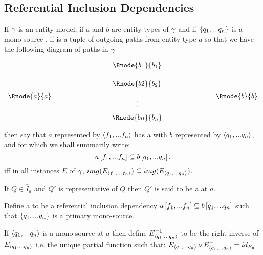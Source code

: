 \subsection{Referential Inclusion Dependencies}


\begin{definition}
If $\gamma$ is an entity model, 
if $a$ and $b$ are entity types of  $\gamma$ and  if $\left\{q_1,...q_n\right\}$
is a mono-source ,
if \fntuple is a tuple of outgoing paths from entity type $a$  
so that we have the following diagram of paths in $\gamma$
\setlength{\arraycolsep}{.2cm}
\begin{center}
$
\begin{array}{cp{2cm}ccp{2cm}c}
             & &         & \Rnode{b1}{b_1} &&               \\ [0.5cm]
						 & &         & \Rnode{b2}{b_2} &&               \\ [0.2cm]
\Rnode{a}{a} & &         &                 &&  \Rnode{b}{b} \\ [-0.2cm]						
             & &         &    \vdots       &&               \\ [0.2cm]
             & &         & \Rnode{bn}{b_n} &&               \\ 
\end{array}
$
\end{center}
then say that $a$ represented by $\langle f_1,...f_n\rangle$ 
has a  with $b$ represented by $\langle q_1,...q_n\rangle$, and for which we shall summarily write:
$$
a\left[f_1,...f_n\right]\subseteq b\left[q_1,...q_n\right],
$$
iff in all instances $E$ of $\gamma$,
$img(E_{\langle f_1,...f_n\rangle}) \subseteq img(E_{\langle q_1,...q_n\rangle})$. 
\end{definition}

\begin{definition}
If $Q \in \bar{I}_a$ and $Q'$ is representative of $Q$ then $Q'$ is said to be
a  at $a$. 
\end{definition}
\begin{definition}
Define a  to be a
referential inclusion dependency $a\left[f_1,...f_n\right]\subseteq b\left[q_1,...q_n\right]$
such that $\left\{q_1,...q_n\right\}$ is a primary mono-source.
\end{definition}

If $\langle q_1,...q_n\rangle$ is a mono-source at $a$ then define $E_{\langle q_1,...q_n\rangle}^{-1}$ to be the right inverse of
$E_{\langle q_1,...q_n\rangle}$ i.e. the unique partial function such that:
$E_{\langle q_1,...q_n\rangle} \circ E_{\langle q_1,...q_n\rangle}^{-1} = id_{E_a}$

